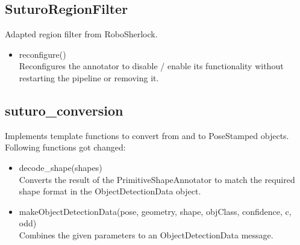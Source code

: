 \documentclass[main.tex]{subfiles}
\begin{document}
\subsection{SuturoRegionFilter}
Adapted region filter from RoboSherlock.

\begin{itemize}
\item reconfigure()\\
Reconfigures the annotator to disable / enable its functionality without restarting the pipeline or removing it.
\end{itemize}

\subsection{suturo\_conversion}
Implements template functions to convert from and to PoseStamped objects.
Following functions got changed:

\begin{itemize}
\item decode\_shape(shapes)\\
Converts the result of the PrimitiveShapeAnnotator to match the required shape format in the ObjectDetectionData object.

\item makeObjectDetectionData(pose, geometry, shape, objClass, confidence, c, odd)\\
Combines the given parameters to an ObjectDetectionData message.
\end{itemize}

\endgroup
\end{document}
